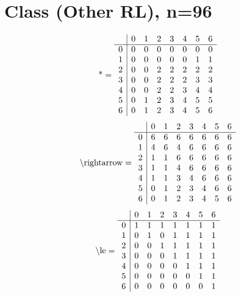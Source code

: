 \documentclass[11pt]{article}
\begin{document}
\section{Class (Other RL), n=96}
\[\text{*} = 
\begin{array}{r | r r r r r r r}
 & 0 & 1 & 2 & 3 & 4 & 5 & 6 \\ \hline
0 & 0 & 0 & 0 & 0 & 0 & 0 & 0 \\
1 & 0 & 0 & 0 & 0 & 0 & 1 & 1 \\
2 & 0 & 0 & 2 & 2 & 2 & 2 & 2 \\
3 & 0 & 0 & 2 & 2 & 2 & 3 & 3 \\
4 & 0 & 0 & 2 & 2 & 3 & 4 & 4 \\
5 & 0 & 1 & 2 & 3 & 4 & 5 & 5 \\
6 & 0 & 1 & 2 & 3 & 4 & 5 & 6 \\
\end{array}
\]
\[\text{\textbackslash rightarrow} = 
\begin{array}{r | r r r r r r r}
 & 0 & 1 & 2 & 3 & 4 & 5 & 6 \\ \hline
0 & 6 & 6 & 6 & 6 & 6 & 6 & 6 \\
1 & 4 & 6 & 4 & 6 & 6 & 6 & 6 \\
2 & 1 & 1 & 6 & 6 & 6 & 6 & 6 \\
3 & 1 & 1 & 4 & 6 & 6 & 6 & 6 \\
4 & 1 & 1 & 3 & 4 & 6 & 6 & 6 \\
5 & 0 & 1 & 2 & 3 & 4 & 6 & 6 \\
6 & 0 & 1 & 2 & 3 & 4 & 5 & 6 \\
\end{array}
\]
\[\text{\textbackslash le} = 
\begin{array}{r | r r r r r r r}
 & 0 & 1 & 2 & 3 & 4 & 5 & 6 \\ \hline
0 & 1 & 1 & 1 & 1 & 1 & 1 & 1 \\
1 & 0 & 1 & 0 & 1 & 1 & 1 & 1 \\
2 & 0 & 0 & 1 & 1 & 1 & 1 & 1 \\
3 & 0 & 0 & 0 & 1 & 1 & 1 & 1 \\
4 & 0 & 0 & 0 & 0 & 1 & 1 & 1 \\
5 & 0 & 0 & 0 & 0 & 0 & 1 & 1 \\
6 & 0 & 0 & 0 & 0 & 0 & 0 & 1 \\
\end{array}
\]
\end{document}
